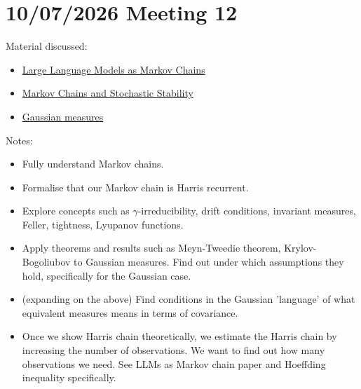 \documentclass{article}
\begin{document}
\section{10/07/2026 Meeting 12}
Material discussed:
\begin{itemize}
    \item \href{https://arxiv.org/abs/2410.02724}{Large Language Models as Markov Chains}
    \item \href{https://www.cambridge.org/core/books/markov-chains-and-stochastic-stability/E2B82BFB409CD2F7D67AFC5390C565EC}{Markov Chains and Stochastic Stability}
    \item \href{https://www.ams.org/surv/062}{Gaussian measures}
\end{itemize}
Notes:
\begin{itemize}
    \item Fully understand Markov chains.
    \item Formalise that our Markov chain is Harris recurrent.
    \item Explore concepts such as $\gamma$-irreducibility, drift conditions, invariant measures, Feller, tightness, Lyupanov functions.
    \item Apply theorems and results such as Meyn-Tweedie theorem, Krylov-Bogoliubov to Gaussian measures. Find out under which assumptions they hold, specifically for the Gaussian case.
    \item (expanding on the above) Find conditions in the Gaussian 'language' of what equivalent measures means in terms of covariance.
    \item Once we show Harris chain theoretically, we estimate the Harris chain by increasing the number of observations. We want to find out how many observations we need. See LLMs as Markov chain paper and Hoeffding inequality specifically.

\end{itemize}
\end{document}
